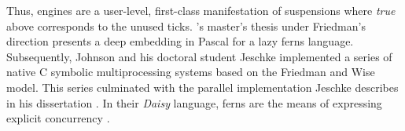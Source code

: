 \noindent
Thus, engines are a user-level, first-class manifestation of
suspensions where \emph{true} above corresponds to the unused ticks.  
\citeauthor{Johnson-77}'s master's thesis \citeyearpar{Johnson-77} 
under Friedman's direction presents
a deep embedding in Pascal for a lazy ferns language.  Subsequently,
Johnson and his doctoral student Jeschke implemented a series of
native C symbolic multiprocessing systems based on the Friedman and
Wise model.  This series culminated with the parallel implementation
Jeschke describes in his dissertation \cite{Jeschke-PHD-95}.  In their
\emph{Daisy} language, ferns are the means of expressing explicit
concurrency \cite{Johnson-83}.




















